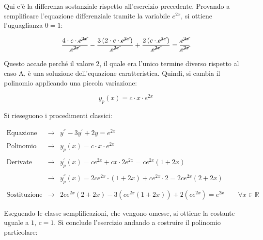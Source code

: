 \documentclass[a4paper]{article}
\begin{document}
	\noindent
	Qui c'è la differenza sostanziale rispetto all'esercizio precedente. Provando a semplificare l'equazione differenziale tramite la variabile $e^{2x}$, si ottiene l'uguaglianza $0 = 1$:
	
	\begin{equation*}
		\dfrac{4 \cdot c \cdot \cancel{e^{2x}}}{\cancel{e^{2x}}} - \dfrac{3 \left(2 \cdot c \cdot \cancel{e^{2x}}\right)}{\cancel{e^{2x}}} + \dfrac{2 \left(c \cdot \cancel{e^{2x}}\right)}{\cancel{e^{2x}}} = \dfrac{\cancel{e^{2x}}}{\cancel{e^{2x}}}
	\end{equation*}

	\noindent
	Questo accade perché il valore $2$, il quale era l'unico termine diverso rispetto al caso A, è una soluzione dell'equazione caratteristica. Quindi, si cambia il polinomio applicando una piccola variazione:
	
	\begin{equation*}
		y_{p}\left(x\right) = c \cdot x \cdot e^{2x}
	\end{equation*}

	\noindent
	Si rieseguono i procedimenti classici:
	
	\begin{equation*}
		\begin{array}{lll}
			\text{Equazione differenziale}	& \longrightarrow & y^{''} - 3y^{'} +2y = e^{2x} \\
			&& \\
			\text{Polinomio}				& \longrightarrow & y_{p}\left(x\right) = c \cdot x \cdot e^{2x} \\
			&& \\
			\text{Derivate del polinomio}	& \longrightarrow & y_{p}^{'}\left(x\right)	= ce^{2x} + cx \cdot 2e^{2x} = ce^{2x}\left(1 + 2x\right) \\
			&& \\
			& \longrightarrow & y_{p}^{''}\left(x\right) = 2ce^{2x} \cdot \left(1 + 2x\right) + ce^{2x} \cdot 2 = 2ce^{2x}\left(2 + 2x\right) \\
			&& \\
			\text{Sostituzione}				& \longrightarrow & 2ce^{2x}\left(2 + 2x\right) - 3 \left(ce^{2x}\left(1 + 2x\right)\right) + 2\left(ce^{2x}\right) = e^{2x} \hspace{2em} \forall x \in \mathbb{R}
		\end{array}
	\end{equation*}

	\noindent
	Eseguendo le classe semplificazioni, che vengono omesse, si ottiene la costante uguale a $1$, $c = 1$. Si conclude l'esercizio andando a costruire il polinomio particolare:
	
\end{document}

